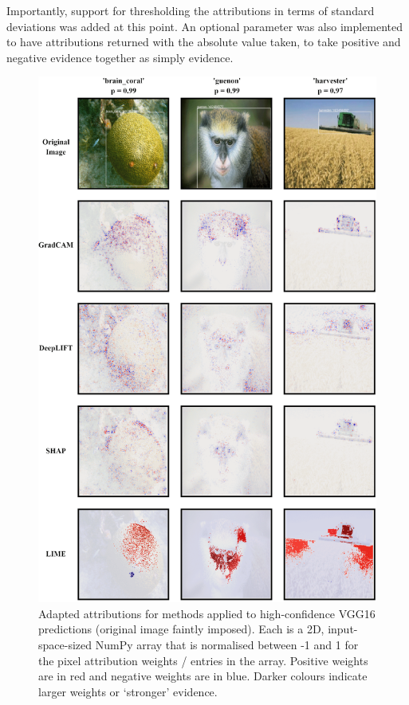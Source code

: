 \documentclass[main]{subfiles}
\begin{document}
Importantly, support for thresholding the attributions in terms of standard deviations was added at this point. An optional parameter was also implemented to have attributions returned with the absolute value taken, to take positive and negative evidence together as simply evidence.

\begin{figure}[htbp]
\centering
\includegraphics[scale=0.28]{method_box_adapted_1.png}
\caption{Adapted attributions for methods applied to high-confidence VGG16 predictions (original image faintly imposed). Each is a 2D, input-space-sized NumPy array that is normalised between -1 and 1 for the pixel attribution weights / entries in the array. Positive weights are in red and negative weights are in blue. Darker colours indicate larger weights or `stronger' evidence.}
\label{panel2img}
\end{figure}
\end{document}
